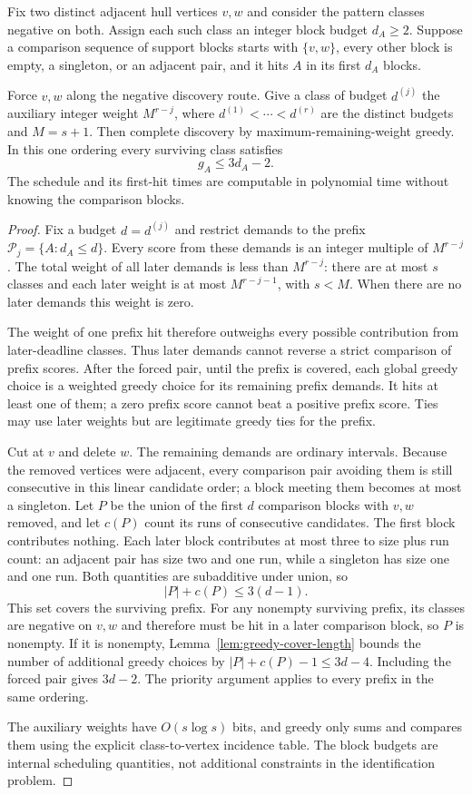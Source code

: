 \begin{lemma}\label{lem:deadline-cover}
Fix two distinct adjacent hull vertices $v,w$ and consider the
pattern classes negative on both. Assign each such class an integer
block budget $d_A\ge2$. Suppose a comparison sequence of support
blocks starts with $\{v,w\}$, every other block is empty, a singleton,
or an adjacent pair, and it hits $A$ in its first $d_A$ blocks.

Force $v,w$ along the negative discovery route. Give a class of
budget $d^{(j)}$ the auxiliary integer weight $M^{r-j}$, where
$d^{(1)}<\cdots<d^{(r)}$ are the distinct budgets and $M=s+1$.
Then complete discovery by maximum-remaining-weight greedy.
In this one ordering every surviving class satisfies
\[
 g_A\le3d_A-2.
\]
The schedule and its first-hit times are computable in polynomial
time without knowing the comparison blocks.
\end{lemma}
\begin{proof}
Fix a budget $d=d^{(j)}$ and restrict demands to the prefix
$\mathcal P_j=\{A:d_A\le d\}$. Every score from these demands
is an integer multiple of $M^{r-j}$. The total weight of all later
demands is less than $M^{r-j}$: there are at most $s$ classes and
each later weight is at most $M^{r-j-1}$, with $s<M$.
When there are no later demands this weight is zero.

The weight of one prefix hit therefore outweighs every possible
contribution from later-deadline classes. Thus later demands cannot
reverse a strict comparison of prefix scores. After the forced pair,
until the prefix is covered,
each global greedy choice
is a weighted greedy choice for its remaining prefix demands.
It hits at least one of them; a zero prefix score cannot beat a
positive prefix score. Ties may use later weights but are legitimate
greedy ties for the prefix.

Cut at $v$ and delete $w$. The remaining demands are ordinary
intervals. Because the removed vertices were adjacent, every
comparison pair avoiding them is still consecutive in this linear
candidate order; a block meeting them becomes at most a singleton.
Let $P$ be the union of the first $d$ comparison blocks with $v,w$
removed, and let $c(P)$ count its runs of consecutive candidates.
The first block contributes nothing. Each later block contributes
at most three to size plus run count: an adjacent pair has size two
and one run, while a singleton has size one and one run. Both
quantities are subadditive under union, so
\[
 |P|+c(P)\le3(d-1).
\]
This set covers the surviving prefix. For any nonempty surviving
prefix, its classes are negative on $v,w$ and therefore must be hit
in a later comparison block, so $P$ is nonempty.
If it is nonempty,
Lemma~\ref{lem:greedy-cover-length} bounds the number of additional
greedy choices by $|P|+c(P)-1\le3d-4$.
Including the forced pair gives $3d-2$.
The priority argument applies to every prefix in the same ordering.

The auxiliary weights have $O(s\log s)$ bits, and greedy only sums
and compares them using the explicit class-to-vertex incidence
table. The block budgets are internal scheduling quantities, not
additional constraints in the identification problem.
\end{proof}

